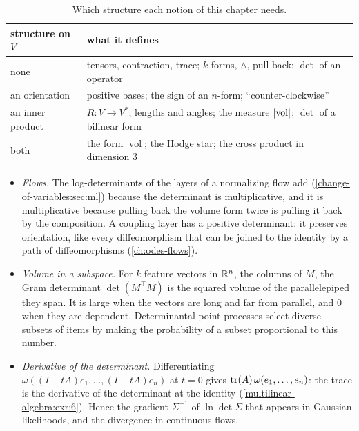 \begin{notechapter}
\begin{table}[ht]
\centering
\begin{tabular}{@{}ll@{}}
\toprule
structure on $V$ & what it defines \\
\midrule
none & tensors, contraction, trace; $k$-forms, $\wedge$, pull-back;
  $\det$ of an operator \\
an orientation & positive bases; the sign of an $n$-form;
  ``counter-clockwise'' \\
an inner product & $R:V\to V^*$; lengths and angles; the measure
  $\left|\operatorname{vol}\right|$; $\det$ of a bilinear form \\
both & the form $\operatorname{vol}$; the Hodge star; the cross product
  in dimension $3$ \\
\bottomrule
\end{tabular}
\caption{Which structure each notion of this chapter needs.}
\label{multilinear-algebra:tab:structure}
\end{table}

\begin{mlthread}
\begin{itemize}[nosep]
  \item \emph{Flows.} The log-determinants of the layers of a
        normalizing flow add (\cref{change-of-variables:sec:ml})
        because the determinant is multiplicative, and it is
        multiplicative because pulling back the volume form twice is
        pulling it back by the composition. A coupling layer has a
        positive determinant: it preserves orientation, like every
        diffeomorphism that can be joined to the identity by a path of
        diffeomorphisms (\cref{ch:odes-flows}).
  \item \emph{Volume in a subspace.} For $k$ feature vectors in
        $\mathbb{R}^n$, the columns of $M$, the Gram determinant
        $\det(M^\top M)$ is the squared volume of the parallelepiped
        they span. It is large when the vectors are long and far from
        parallel, and $0$ when they are dependent. Determinantal point
        processes select diverse subsets of items by making the
        probability of a subset proportional to this number.
  \item \emph{Derivative of the determinant.} Differentiating
        $\omega((I + tA)e_1,\dots,(I + tA)e_n)$ at $t = 0$ gives
        $\operatorname{tr}(A)\,\omega(e_1,\dots,e_n)$: the trace is the derivative of
        the determinant at the identity
        (\cref{multilinear-algebra:exr:6}). Hence the gradient
        $\Sigma^{-1}$ of $\ln\det\Sigma$ that appears in Gaussian
        likelihoods, and the divergence in continuous flows.
\end{itemize}
\end{mlthread}


\end{notechapter}
